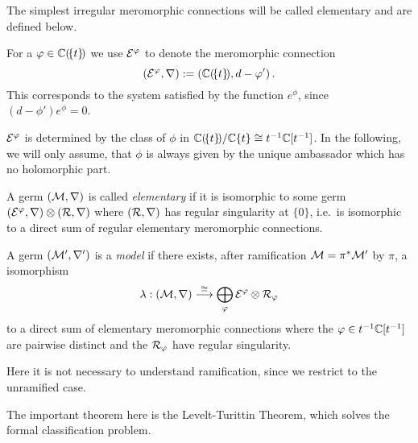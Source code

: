 The simplest irregular meromorphic connections will be called elementary and
are defined below.
\begin{defn}
  For a $\varphi\in\mathbb{C}(\!\{t\}\!)$ we use $\mathcal{E}^{\varphi}$ to denote the meromorphic
  connection
  \[
    (\mathcal{E}^{\varphi},\nabla):=(\mathbb{C}(\!\{t\}\!),d-\varphi')\,.
  \]
  This corresponds to the system satisfied by the function $e^\phi$, since
  $(d-\phi')e^\phi=0$.
  \begin{s-prop}\label{cor:uniqueAmbassadorForPhi}
    $\mathcal{E}^\varphi$ is determined by the class of $\phi$ in
    $\mathbb{C}(\!\{t\}\!)/\mathbb{C}\{t\}\cong t^{-1}\mathbb{C}[t^{-1}]$. In the following, we will
    only assume, that $\phi$ is always given by the unique ambassador which has
    no holomorphic part.
  \end{s-prop}
  A germ $(\mathcal{M},\nabla)$ is called \emph{elementary} if it is isomorphic to some
  germ $(\mathcal{E}^\varphi,\nabla)\otimes(\mathcal{R},\nabla)$ where $(\mathcal{R},\nabla)$ has regular
  singularity at $\{0\}$, i.e.\ is isomorphic to a direct sum of regular
  elementary meromorphic connections.
\end{defn}
\begin{defn}\label{defn:model}
  \def\myPhi{\textcolor{red!60!black}{\phi}}
  \def\myE{\textcolor{green!40!black}{\cE^{\myPhi}}}
  A germ $(\mathcal{M}',\nabla')$ is a \emph{model} if there exists, after ramification
  $\mathcal{M}=\pi^*\mathcal{M}'$ by $\pi$, a isomorphism
  \[
    \lambda:(\mathcal{M},\nabla) \overset{\cong}{\longrightarrow}
    \bigoplus_{\varphi} \mathcal{E}^\varphi \otimes \mathcal{R}_{\varphi}
  \]
  to a direct sum of elementary meromorphic connections where the
  $\varphi\in t^{-1}\mathbb{C}[t^{-1}]$ are pairwise distinct and the $\mathcal{R}_{\varphi}$ have
  regular singularity.
  \begin{s-rem}
    Here it is not necessary to understand ramification, since we restrict to
    the unramified case.
  \end{s-rem}
\end{defn}
The important theorem here is the Levelt-Turittin Theorem, which solves the
formal classification problem.
